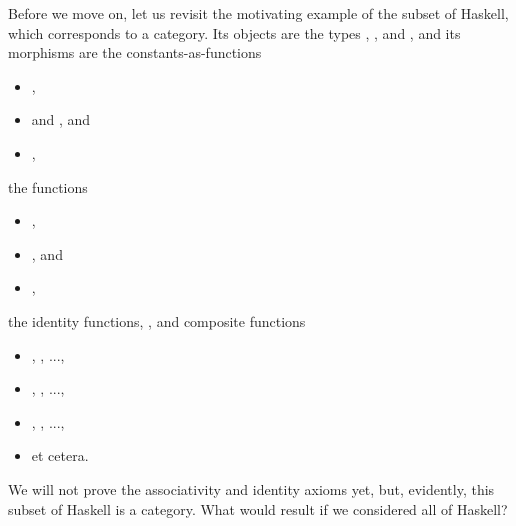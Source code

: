 \begin{example}
  \label{ex:category-haskell}


  Before we move on, let us revisit the motivating example of the
  subset of Haskell, which corresponds to a category. Its objects are
  the types \texthaskell{()}, , and
  , and its morphisms are the constants-as-functions
  \begin{itemize}
  \item
    \texthaskell{() :: () -> ()},

  \item
     and , and

  \item
    ,

  \end{itemize}
  the functions
  \begin{itemize}
  \item
    ,

  \item
    , and

  \item
    ,

  \end{itemize}
  the identity functions, , and composite functions
  \begin{itemize}
  \item
    , , ...,

  \item
    , , ...,

  \item
    , , ...,

  \item
    et cetera.

  \end{itemize}
  We will not prove the associativity and identity axioms yet, but,
  evidently, this subset of Haskell is a category. What would result
  if we considered all of Haskell?

\end{example}

